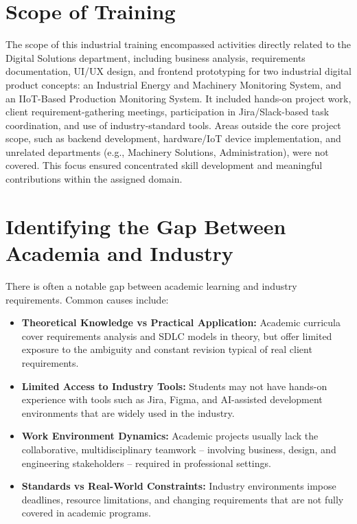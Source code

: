 \section{Scope of Training}

\par The scope of this industrial training encompassed activities directly related to the Digital Solutions department, including business analysis, requirements documentation, UI/UX design, and frontend prototyping for two industrial digital product concepts: an Industrial Energy and Machinery Monitoring System, and an IIoT-Based Production Monitoring System. It included hands-on project work, client requirement-gathering meetings, participation in Jira/Slack-based task coordination, and use of industry-standard tools. Areas outside the core project scope, such as backend development, hardware/IoT device implementation, and unrelated departments (e.g., Machinery Solutions, Administration), were not covered. This focus ensured concentrated skill development and meaningful contributions within the assigned domain.

\section{Identifying the Gap Between Academia and Industry}

\par There is often a notable gap between academic learning and industry requirements. Common causes include:

\begin{itemize}
    \item \textbf{Theoretical Knowledge vs Practical Application:} Academic curricula cover requirements analysis and SDLC models in theory, but offer limited exposure to the ambiguity and constant revision typical of real client requirements.
    \item \textbf{Limited Access to Industry Tools:} Students may not have hands-on experience with tools such as Jira, Figma, and AI-assisted development environments that are widely used in the industry.
    \item \textbf{Work Environment Dynamics:} Academic projects usually lack the collaborative, multidisciplinary teamwork -- involving business, design, and engineering stakeholders -- required in professional settings.
    \item \textbf{Standards vs Real-World Constraints:} Industry environments impose deadlines, resource limitations, and changing requirements that are not fully covered in academic programs.
\end{itemize}

